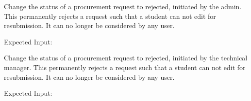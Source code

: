 \documentclass[letterpaper,10pt,english]{sphinxmanual}
\begin{document}
\begin{fulllineitems}

\begin{fulllineitems}
\label{\detokenize{apidoc/utdesign_procurement:utdesign_procurement.apigateway.ApiGateway.procurementRejectAdmin}}
Change the status of a procurement request to rejected,
initiated by the admin. This permanently rejects a request
such that a student can not edit for resubmission. It can
no longer be considered by any user.

Expected Input:

\begin{sphinxVerbatim}[commandchars=\\\{\}]
     
     
\end{sphinxVerbatim}

\end{fulllineitems}


\begin{fulllineitems}
\label{\detokenize{apidoc/utdesign_procurement:utdesign_procurement.apigateway.ApiGateway.procurementRejectManager}}
Change the status of a procurement request to rejected,
initiated by the technical manager. This permanently rejects
a request such that a student can not edit for resubmission.
It can no longer be considered by any user.

Expected Input:

\begin{sphinxVerbatim}[commandchars=\\\{\}]
     
     
\end{sphinxVerbatim}


\end{fulllineitems}
\end{fulllineitems}
\end{document}
